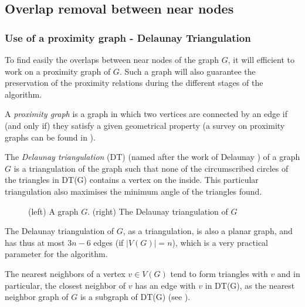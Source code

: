 \documentclass[12pt]{report}
\begin{document}
\subsection{Overlap removal between near nodes}

\subsubsection{Use of a proximity graph - Delaunay Triangulation}

To find easily the overlaps between near nodes of the graph $G$, it will efficient to work on a proximity graph of $G$. Such a graph will also guarantee the preservation of the proximity relations during the different stages of the algorithm.

A \emph{proximity graph} is a graph in which two vertices are connected by an edge if (and only if) they satisfy a given geometrical property (a survey on proximity graphs can be found in \cite{JT92}).

\bigskip
The \emph{Delaunay triangulation} (DT) (named after the work of Delaunay \cite{Delaunay34}) of a graph $G$ is a triangulation of the graph such that none of the circumscribed circles of the triangles in DT(G) contains a vertex on the inside. This particular triangulation also maximises the minimum angle of the triangles found.

\begin{figure}[h]
	\center
  \setlength\fboxsep{5pt}
  \setlength\fboxrule{0.5pt}
  \caption{(left) A graph $G$. (right) The Delaunay triangulation of $G$}
  \label{DT}
\end{figure}

The Delaunay triangulation of $G$, as a triangulation, is also a planar graph, and has thus at most $3n -6$ edges (if $|V(G)| = n$), which is a very practical parameter for the algorithm.

\bigskip
The nearest neighbors of a vertex $v \in V(G)$ tend to form triangles with $v$ and in particular, the closest neighbor of $v$ has an edge with $v$ in DT(G), as the nearest neighbor graph of $G$ is a subgraph of DT(G) (see \cite{JT92}).
\end{document}
